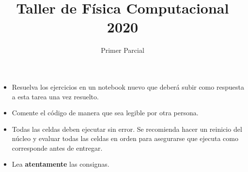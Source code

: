 \documentclass[a4paper,12pt]{article}
\begin{document}
\title{Taller de Física Computacional 2020}

\author{Primer Parcial}

\maketitle

\begin{itemize}
    \item Resuelva los ejercicios en un notebook nuevo que deberá subir como respuesta a esta tarea una vez resuelto.
    \item Comente el código de manera que sea legible por otra persona.
    \item Todas las celdas deben ejecutar sin error. Se recomienda hacer un reinicio del núcleo y evaluar todas las celdas en orden para asegurarse que ejecuta como corresponde antes de entregar.
    \item Lea {\bf atentamente} las consignas.
\end{itemize}
\end{document}
